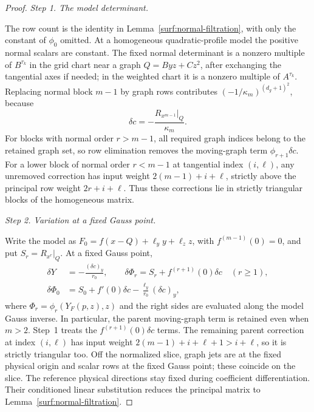\documentclass[11pt]{amsart}
\theoremstyle{definition}
\theoremstyle{remark}
\numberwithin{equation}{section}
\begin{document}
\begin{proof}
\par\medskip\noindent\textit{Step 1. The model determinant.}\par\nobreak\smallskip

The row count is the identity in Lemma~\ref{surf:normal-filtration}, with only the constant of $\phi_0$ omitted. At a homogeneous quadratic-profile model the positive normal scalars are constant. The fixed normal determinant is a nonzero multiple of $B^{\tau_k}$ in the grid chart near a graph $Q=Byz+Cz^2$, after exchanging the tangential axes if needed; in the weighted chart it is a nonzero multiple of $A^{\tau_k}$. Replacing normal block $m-1$ by graph rows contributes $(-1/\kappa_m)^{(d_g+1)^2}$, because
\[
 \delta c=-\frac{R_{x^{m-1}}|_Q}{\kappa_m}.
\]
For blocks with normal order $r>m-1$, all required graph indices belong to the retained graph set, so row elimination removes the moving-graph term $\phi_{r+1}\delta c$. For a lower block of normal order $r<m-1$ at tangential index $(i,\ell)$, any unremoved correction has input weight $2(m-1)+i+\ell$, strictly above the principal row weight $2r+i+\ell$. Thus these corrections lie in strictly triangular blocks of the homogeneous matrix.

\par\medskip\noindent\textit{Step 2. Variation at a fixed Gauss point.}\par\nobreak\smallskip

Write the model as $F_0=f(x-Q)+\ell_y y+\ell_z z$, with $f^{(m-1)}(0)=0$, and put $S_r=R_{x^r}|_Q$. At a fixed Gauss point,
\[
 \begin{aligned}
 \delta Y&=-\frac{(\delta c)_y}{r_0},\qquad
 \delta\Phi_r=S_r+f^{(r+1)}(0)\delta c\quad(r\ge1),\\
 \delta\Phi_0&=S_0+f'(0)\delta c-\frac{\ell_y}{r_0}(\delta c)_y,
 \end{aligned}
\]
where $\Phi_r=\phi_r(Y_F(p,z),z)$ and the right sides are evaluated along the model Gauss inverse. In particular, the parent moving-graph term is retained even when $m>2$. Step~1 treats the $f^{(r+1)}(0)\delta c$ terms. The remaining parent correction at index $(i,\ell)$ has input weight $2(m-1)+i+\ell+1>i+\ell$, so it is strictly triangular too. Off the normalized slice, graph jets are at the fixed physical origin and scalar rows at the fixed Gauss point; these coincide on the slice. The reference physical directions stay fixed during coefficient differentiation. Their conditioned linear substitution reduces the principal matrix to Lemma~\ref{surf:normal-filtration}.


\end{proof}
\end{document}
